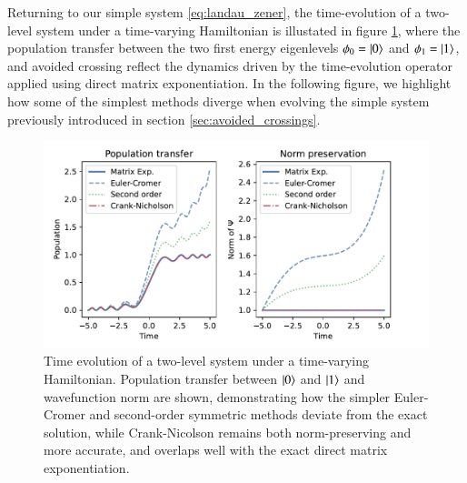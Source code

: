 \documentclass{subfiles}
\begin{document}
Returning to our simple system \eqref{eq:landau_zener}, the time-evolution of a two-level system under a time-varying Hamiltonian is illustated in figure \ref{fig:landau_zener}, where the population transfer between the two first energy eigenlevels $\phi_0 = \ket{0}$ and $\phi_1=\ket{1}$, and avoided crossing reflect the dynamics driven by the time-evolution operator applied using direct matrix exponentiation. In the following figure, we highlight how some of the simplest methods diverge when evolving the simple system previously introduced in section \ref{sec:avoided_crossings}.
\begin{figure}[h!]
    \centering
    \includegraphics[width=1.0\textwidth]{figs/landau_zener_numerical_methods.pdf}
    \caption{Time evolution of a two-level system under a time-varying Hamiltonian. Population transfer between $\ket{0}$ and $\ket{1}$ and wavefunction norm are shown, demonstrating how the simpler Euler-Cromer and second-order symmetric methods deviate from the exact solution, while Crank-Nicolson remains both norm-preserving and more accurate, and overlaps well with the exact direct matrix exponentiation.}\label{fig:landau_zener}
\end{figure}
\end{document}
